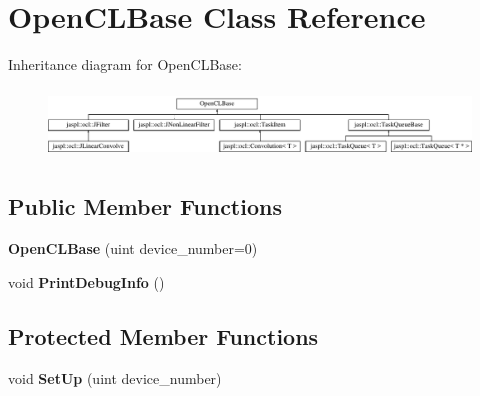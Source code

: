 \hypertarget{class_open_c_l_base}{}\section{Open\+C\+L\+Base Class Reference}
\label{class_open_c_l_base}
Inheritance diagram for Open\+C\+L\+Base\+:\begin{figure}[H]
\begin{center}
\leavevmode
\includegraphics[height=1.846154cm]{class_open_c_l_base}
\end{center}
\end{figure}
\subsection*{Public Member Functions}
\begin{DoxyCompactItemize}
\item 
{\bfseries Open\+C\+L\+Base} (uint device\+\_\+number=0)\hypertarget{class_open_c_l_base_a800c1a56b9bb426cff09fd738b8ac5cc}{}\label{class_open_c_l_base_a800c1a56b9bb426cff09fd738b8ac5cc}

\item 
void {\bfseries Print\+Debug\+Info} ()\hypertarget{class_open_c_l_base_ad526fef24d45bb5813136c90e00b4c39}{}\label{class_open_c_l_base_ad526fef24d45bb5813136c90e00b4c39}

\end{DoxyCompactItemize}
\subsection*{Protected Member Functions}
\begin{DoxyCompactItemize}
\item 
void {\bfseries Set\+Up} (uint device\+\_\+number)\hypertarget{class_open_c_l_base_afb56376f83aee169708e8da572003e0b}{}\label{class_open_c_l_base_afb56376f83aee169708e8da572003e0b}

\end{DoxyCompactItemize}
